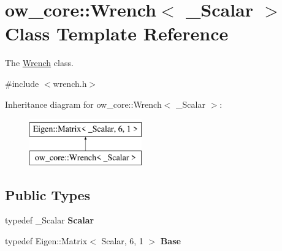 \hypertarget{classow__core_1_1Wrench}{}\section{ow\+\_\+core\+:\+:Wrench$<$ \+\_\+\+Scalar $>$ Class Template Reference}
\label{classow__core_1_1Wrench}


The \hyperlink{classow__core_1_1Wrench}{Wrench} class.  




{\ttfamily \#include $<$wrench.\+h$>$}

Inheritance diagram for ow\+\_\+core\+:\+:Wrench$<$ \+\_\+\+Scalar $>$\+:\begin{figure}[H]
\begin{center}
\leavevmode
\includegraphics[height=2.000000cm]{dc/dd9/classow__core_1_1Wrench}
\end{center}
\end{figure}
\subsection*{Public Types}
\begin{DoxyCompactItemize}
\item 
typedef \+\_\+\+Scalar {\bfseries Scalar}\hypertarget{classow__core_1_1Wrench_af462e5302ef95be5f70d5a7889c994ca}{}\label{classow__core_1_1Wrench_af462e5302ef95be5f70d5a7889c994ca}

\item 
typedef Eigen\+::\+Matrix$<$ Scalar, 6, 1 $>$ {\bfseries Base}\hypertarget{classow__core_1_1Wrench_a493b8a5d84ade9788815b5967f67774a}{}\label{classow__core_1_1Wrench_a493b8a5d84ade9788815b5967f67774a}

\end{DoxyCompactItemize}
